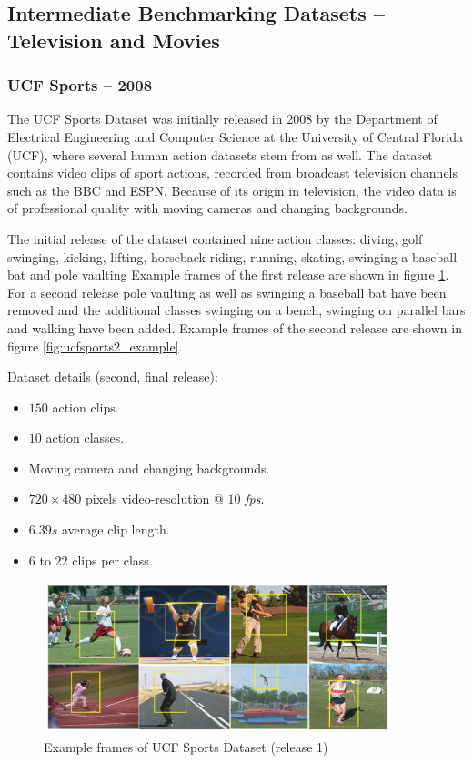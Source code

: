 \subsection{Intermediate Benchmarking Datasets -- Television and Movies}


\subsubsection{UCF Sports -- 2008}
The UCF Sports Dataset was initially released in 2008 by the Department of Electrical Engineering and Computer Science at the University of Central Florida (UCF), where several human action datasets stem from as well.
The dataset contains video clips of sport actions, recorded from broadcast television channels such as the BBC and ESPN.
Because of its origin in television, the video data is of professional quality with moving cameras and changing backgrounds.

The initial release of the dataset \cite{rodriguez_action_2008} contained nine action classes: diving, golf swinging, kicking, lifting, horseback riding, running, skating, swinging a baseball bat and pole vaulting
Example frames of the first release are shown in figure \ref{fig:ucfsports1_example}.
For a second release \cite{soomro_action_2014} pole vaulting as well as swinging a baseball bat have been removed and the additional classes swinging on a bench, swinging on parallel bars and walking have been added.
Example frames of the second release are shown in figure \ref{fig:ucfsports2_example}.

Dataset details (second, final release): \cite{_center_????}
\begin{itemize}
    \item $150$ action clips.
    \item $10$ action classes.
    \item Moving camera and changing backgrounds.
    \item $720 \times 480$ pixels video-resolution @ $10$ \textit{fps}.
    \item $6.39s$ average clip length.
    \item $6$ to $22$ clips per class.
\end{itemize}

\begin{figure}[H]
    \centering
    \includegraphics[width=0.9\textwidth]{img_datasets/ucfsports1_example}
    \caption{Example frames of UCF Sports Dataset (release 1) \cite{rodriguez_action_2008}}
    \label{fig:ucfsports1_example}
\end{figure}

